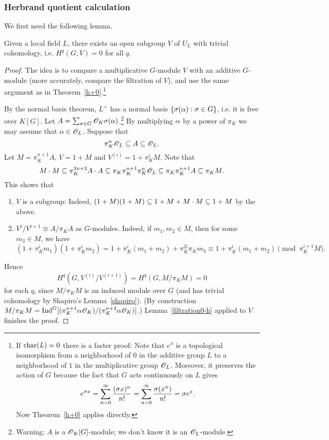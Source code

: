 \subsubsection{Herbrand quotient calculation}
We first need the following lemma.
\begin{lem}
Given a local field $L$, there exists an open subgroup $V$ of $U_L$ with trivial cohomology, i.e. $H^q(G,V)=0$ for all $q$.
\end{lem}
\begin{proof}
The idea is to compare a multiplicative $G$-module $V$ with an additive $G$-module (more accurately, compare the filtration of $V$), and use the same argument as in Theorem~\ref{h+0}.\footnote{If $\operatorname{char}(L)=0$ there is a faster proof: Note that $e^x$ is a topological isomorphism from a neighborhood of $0$ in the additive group $L$ to a neighborhood of $1$ in the multiplicative group $\mathscr{O}_L$. Moreover, it preserves the action of $G$ because the fact that $G$ acts continuously on $L$ gives
\[
e^{\sigma x}=\sum_{n=0}^{\infty} \frac{(\sigma x)^n}{n!} =\sum_{n=0}^{\infty} \frac{\sigma (x^n)}{n!}=\sigma e^x.
\]
Now Theorem~\ref{h+0} applies directly.}

By the normal basis theorem, $L^+$ has a normal basis $\left\{{\sigma(\alpha)}:{\sigma\in G}\right\}$, i.e. it is free over $K[G]$. Let $A=\sum_{\sigma\in G} \mathscr{O}_K\sigma(\alpha)$.\footnote{Warning: $A$ is a $\mathscr{O}_K[G]$-module; we don't know it is an $\mathscr{O}_L$-module.}
By multiplying $\alpha$ by a power of $\pi_K$ we may assume that $\alpha\in \mathscr{O}_L$. %
Suppose that
\[
\pi_K^n\mathscr{O}_L\subseteq A\subseteq \mathscr{O}_L.
\]
Let $M=\pi_K^{n+1}A$,  $V=1+M$ and $V^{(i)}=1+\pi_K^{i} M$.
Note that
\[
M\cdot M\subseteq \pi_K^{2n+2}A\cdot A\subseteq \pi_K\pi_K^{n+1}\pi_K^n\mathscr{O}_L\subseteq
\pi_K\pi_K^{n+1}A\subseteq
\pi_KM.
\]
This shows that
\begin{enumerate}
\item
$V$ is a subgroup: Indeed, $(1+M)(1+M)\subseteq 1+M+M\cdot M\subseteq 1+M$ by the above.
\item
$V^{i}/V^{i+1}\cong A/\pi_K A$ as $G$-modules. Indeed, if $m_1,m_2\in M$, then for some $m_3\in M$, we have
\[
(1+\pi_K^im_1)(1+\pi_K^im_2)= 1+\pi_K^i(m_1+m_2)+\pi_K^{2i} \pi_Km_3
\equiv 1+\pi_K^i(m_1+m_2)\pmod{\pi_K^{i+1}M}.
\]
\end{enumerate}
Hence
\[
H^q(G, V^{(i)}/V^{(i+1)})=H^q(G,M/\pi_KM)=0
\]
for each $q$, since $M/\pi_K M$ is an induced module over $G$ (and has trivial cohomology by Shapiro's Lemma~\ref{shapiro}). (By construction $M/\pi_K M=\operatorname{Ind}^G[(\pi_K^{n+1}\alpha\mathscr{O}_K)/(\pi_K^{n+2}\alpha\mathscr{O}_K)]$.) Lemma~\ref{filtration0-h} applied to $V$ finishes the proof.
\end{proof}
